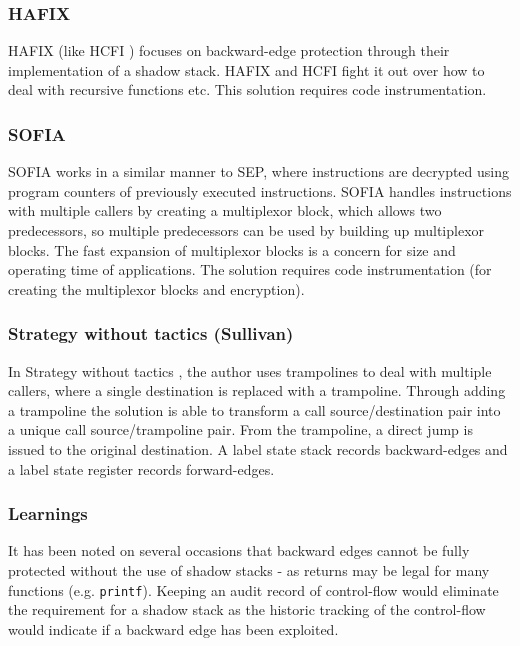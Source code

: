\subsubsection{HAFIX}
HAFIX \cite{Davi2015} (like HCFI \cite{Danger2018}) focuses on backward-edge protection through their implementation of a shadow stack. HAFIX and HCFI fight it out over how to deal with recursive functions etc. This solution requires code instrumentation.

\subsubsection{SOFIA}
SOFIA \cite{Davi2015} works in a similar manner to SEP, where instructions are decrypted using program counters of previously executed instructions. SOFIA handles instructions with multiple callers by creating a multiplexor block, which allows two predecessors, so multiple predecessors can  be used by building up multiplexor blocks. The fast expansion of multiplexor blocks is a concern for size and operating time of applications. The solution requires code instrumentation (for creating the multiplexor blocks and encryption).

\subsubsection{Strategy without tactics (Sullivan)}
In Strategy without tactics \cite{Davi2015}, the author uses trampolines to deal with multiple callers, where a single destination is replaced with a trampoline. Through adding a trampoline the solution is able to transform a call source\slash destination pair into a unique call source\slash trampoline pair. From the trampoline, a direct jump is issued to the original destination. A label state stack records backward-edges and a label state register records forward-edges. 

\subsubsection{Learnings}
It has been noted on several occasions that backward edges cannot be fully protected without the use of shadow stacks - as returns may be legal for many functions (e.g. \verb|printf|). Keeping an audit record of control-flow would eliminate the requirement for a shadow stack as the historic tracking of the control-flow would indicate if a backward edge has been exploited.
